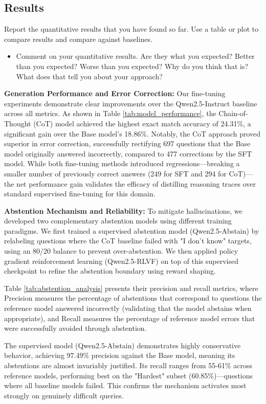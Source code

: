 \documentclass{article}
\begin{document}
\subsection{Results}
Report the quantitative results that you have found so far. Use a table or plot to compare results and compare against baselines.

\begin{itemize}
    \item Comment on your quantitative results. Are they what you expected? Better than you expected? Worse than you expected? Why do you think that is? What does that tell you about your approach?
\end{itemize}

\textbf{Generation Performance and Error Correction:} Our fine-tuning experiments demonstrate clear improvements over the Qwen2.5-Instruct baseline across all metrics. As shown in Table \ref{tab:model_performance}, the Chain-of-Thought (CoT) model achieved the highest exact match accuracy of 24.31\%, a significant gain over the Base model's 18.86\%. Notably, the CoT approach proved superior in error correction, successfully rectifying 697 questions that the Base model originally answered incorrectly, compared to 477 corrections by the SFT model. While both fine-tuning methods introduced regressions—breaking a smaller number of previously correct answers (249 for SFT and 294 for CoT)—the net performance gain validates the efficacy of distilling reasoning traces over standard supervised fine-tuning for this domain.

\textbf{Abstention Mechanism and Reliability:} To mitigate hallucinations, we developed two complementary abstention models using different training paradigms. We first trained a supervised abstention model (Qwen2.5-Abstain) by relabeling questions where the CoT baseline failed with "I don't know" targets, using an 80/20 balance to prevent over-abstention. We then applied policy gradient reinforcement learning (Qwen2.5-RLVF) on top of this supervised checkpoint to refine the abstention boundary using reward shaping.

Table \ref{tab:abstention_analysis} presents their precision and recall metrics, where Precision measures the percentage of abstentions that correspond to questions the reference model answered incorrectly (validating that the model abstains when appropriate), and Recall measures the percentage of reference model errors that were successfully avoided through abstention.

The supervised model (Qwen2.5-Abstain) demonstrates highly conservative behavior, achieving 97.49\% precision against the Base model, meaning its abstentions are almost invariably justified. Its recall ranges from 55-61\% across reference models, performing best on the "Hardest" subset (60.85\%)—questions where all baseline models failed. This confirms the mechanism activates most strongly on genuinely difficult queries.
\end{document}
